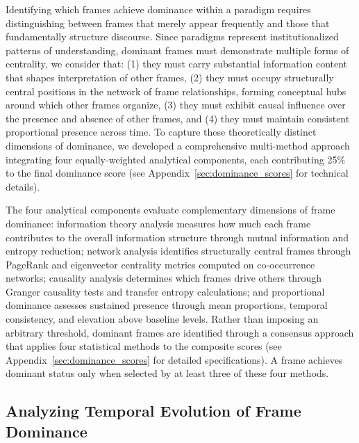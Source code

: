 \documentclass[12pt]{article}
\begin{document}
Identifying which frames achieve dominance within a paradigm requires distinguishing between frames that merely appear frequently and those that fundamentally structure discourse. Since paradigms represent institutionalized patterns of understanding, dominant frames must demonstrate multiple forms of centrality, we consider that: (1) they must carry substantial information content that shapes interpretation of other frames, (2) they must occupy structurally central positions in the network of frame relationships, forming conceptual hubs around which other frames organize, (3) they must exhibit causal influence over the presence and absence of other frames, and (4) they must maintain consistent proportional presence across time. To capture these theoretically distinct dimensions of dominance, we developed a comprehensive multi-method approach integrating four equally-weighted analytical components, each contributing 25\% to the final dominance score (see Appendix~\ref{sec:dominance_scores} for technical details).

The four analytical components evaluate complementary dimensions of frame dominance: information theory analysis measures how much each frame contributes to the overall information structure through mutual information and entropy reduction; network analysis identifies structurally central frames through PageRank and eigenvector centrality metrics computed on co-occurrence networks; causality analysis determines which frames drive others through Granger causality tests and transfer entropy calculations; and proportional dominance assesses sustained presence through mean proportions, temporal consistency, and elevation above baseline levels. Rather than imposing an arbitrary threshold, dominant frames are identified through a consensus approach that applies four statistical methods to the composite scores (see Appendix~\ref{sec:dominance_scores} for detailed specifications). A frame achieves dominant status only when selected by at least three of these four methods.

\subsection{Analyzing Temporal Evolution of Frame Dominance}
\end{document}
